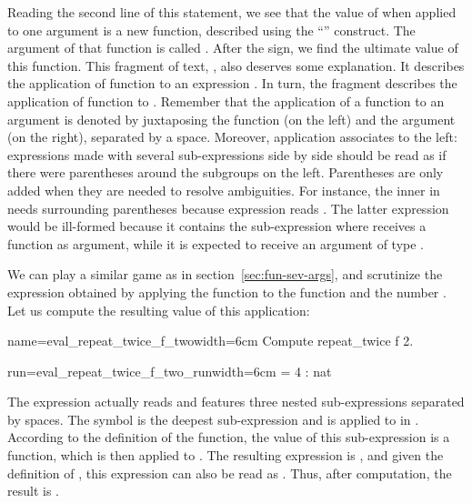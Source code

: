 Reading the second line of this statement, we see that the value
of  when applied to one argument is a new
function, described using the ``'' construct.  The
argument of that function is called .  After the \C{=>} sign, we
find the ultimate value of this function.  This fragment of text, , also deserves some explanation. It describes the
application of function  to an expression .  In turn,
the fragment  describes the application of function  to
. Remember that the  application of a function to an
argument is denoted by juxtaposing the function (on the left) and
the argument (on the right), separated by a space. Moreover,
application associates to the left: expressions made with
several sub-expressions side by side should be read as if there were
parentheses around the subgroups on the left. Parentheses are
only added when they are needed to resolve ambiguities.
For instance, the inner  in
 needs surrounding parentheses because expression
 reads .  The latter expression would be
ill-formed because it contains the sub-expression  where
 receives a function as argument, while it is expected to receive
an argument of type .

We can play a similar game as in section~\ref{sec:fun-sev-args},
and scrutinize the expression obtained by applying the
function  to  the function
 and the number . Let us compute the resulting value of this
application:

\begin{coq-left}{name=eval_repeat_twice_f_two}{width=6cm}
Compute repeat_twice f 2.
\end{coq-left}
\begin{coqout-right}{run=eval_repeat_twice_f_two_run}{width=6cm}
= 4 : nat
\end{coqout-right}

The expression  actually reads
 and features three nested sub-expressions separated by
spaces. The symbol  is the deepest
sub-expression and is applied to  in .
According to the definition of the  function, the value of
this sub-expression is a function, which is then applied to .
The resulting expression is , and given the
definition of , this expression can also
be read as .  Thus, after computation, the result is .

